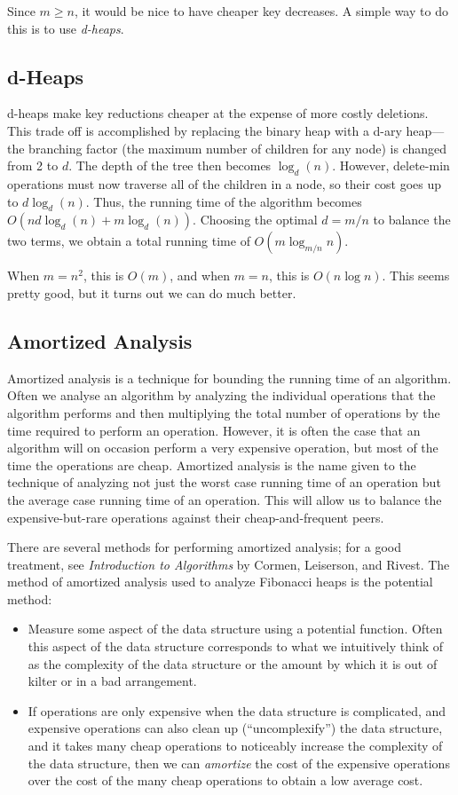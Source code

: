 \documentclass{article}
\begin{document}
Since $m \geq n$, it would be nice to have cheaper key decreases.
A simple way to do this is to use \emph{d-heaps}.

\subsection{d-Heaps}

d-heaps make key reductions cheaper at the expense of more costly
deletions. This trade off is accomplished by replacing the binary heap
with a d-ary heap---the branching factor (the maximum number of
children for any node) is changed from 2 to $d$.  The depth of the
tree then becomes $\log _{d}(n)$.  However, delete-min operations must
now traverse all of the children in a node, so their cost goes up to
$d \log _{d}(n)$.  Thus, the running time of the algorithm becomes
$O(n d \log _{d}(n) + m \log _{d}(n))$. Choosing the optimal $d=m/n$
to balance the two terms, we obtain a total running time of $O(m
\log_{m/n}n)$.

When $m = n^2$, this is $O(m)$, and when $m=n$, this is $O(n \log
n)$. This seems pretty good, but it turns out we can do much better.

\subsection{Amortized Analysis}

Amortized analysis is a technique for bounding the running time of an
algorithm. Often we analyse an algorithm by analyzing the individual
operations that the algorithm performs and then multiplying the total
number of operations by the time required to perform an operation.
However, it is often the case that an algorithm will on occasion
perform a very expensive operation, but most of the time the operations
are cheap. Amortized analysis is the name given to the technique of
analyzing not just the worst case running time of an operation but the
average case running time of an operation. This will allow us to balance
the expensive-but-rare operations against their cheap-and-frequent peers.

There are several methods for performing amortized analysis;  for a
good treatment, see \emph{Introduction to Algorithms} by Cormen,
Leiserson, and Rivest.  The method of amortized analysis used
to analyze Fibonacci heaps is the potential method:

\begin{itemize}
 \item Measure some aspect of the data structure using a potential
function. Often this aspect of the data structure corresponds to what we
intuitively think of as the complexity of the data structure or the
amount by which it is out of kilter or in a bad arrangement.
 \item If operations are only expensive when the data structure is
complicated, and expensive operations can also clean up
(``uncomplexify'') the data structure, and it takes many cheap
operations to noticeably increase
the complexity of the data structure, then we can \emph{amortize} the cost of
the
expensive operations over the cost of the many cheap operations to obtain a low
average cost.
\end{itemize}
\end{document}
